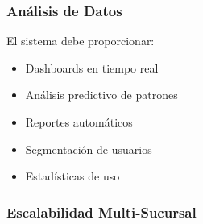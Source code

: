 \documentclass[11pt,a4paper]{article}
\begin{document}
\subsubsection{Análisis de Datos}

El sistema debe proporcionar:
\begin{itemize}
    \item Dashboards en tiempo real
    \item Análisis predictivo de patrones
    \item Reportes automáticos
    \item Segmentación de usuarios
    \item Estadísticas de uso
\end{itemize}

\subsubsection{Escalabilidad Multi-Sucursal}
\end{document}
